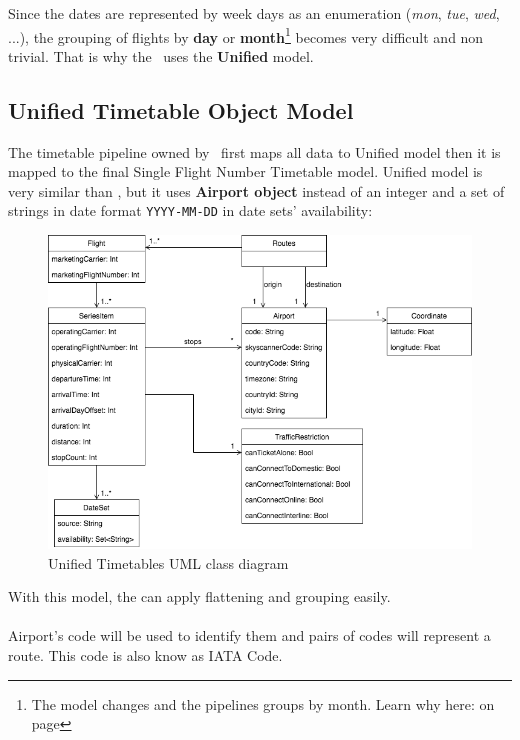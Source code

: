 Since the dates are represented by week days as an enumeration (\textit{mon}, \textit{tue}, \textit{wed}, ...), the grouping of flights by \textbf{day} or \textbf{month}\footnote{The model changes and the pipelines groups by month. Learn why here:  on page \pageref{month_version}} becomes very difficult and non trivial. That is why the \thesis\ uses the \textbf{Unified} model.

\subsection{Unified Timetable Object Model} \label{unified-model}

The timetable pipeline owned by \squad\ first maps all data to Unified model then it is mapped to the final Single Flight Number Timetable model. Unified model is very similar than , but it uses \textbf{Airport object} instead of an integer and a set of strings in date format \texttt{YYYY-MM-DD} in date sets' availability:

\begin{figure}[H]
\centering
\includegraphics[scale=0.6]{diagrams/unified_model.png}
\caption{Unified Timetables UML\cite{uml} class diagram}
\label{unified-uml}
\end{figure}

With this model, the  can apply flattening and grouping easily.
\\\\
Airport's code will be used to identify them and pairs of codes will represent a route. This code is also know as IATA Code\cite{iata_code}.

